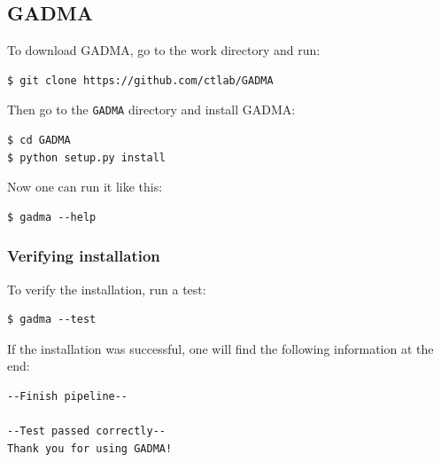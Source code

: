 \documentclass[12pt]{article}
\makeatletter
\newcommand{\py}[1]{\lstinline[language=Python, showstringspaces=False]@#1@}
\makeatother
\begin{document}
\subsection{GADMA}
To download GADMA, go to the work directory and run:

\begin{lstlisting}
$ git clone https://github.com/ctlab/GADMA
\end{lstlisting}

Then go to the \py{GADMA} directory and install GADMA:
\begin{lstlisting}
$ cd GADMA
$ python setup.py install
\end{lstlisting}

Now one can run it like this:
\begin{lstlisting}
$ gadma --help
\end{lstlisting}

\subsubsection{Verifying installation}
To verify the installation, run a test:

\begin{lstlisting}
$ gadma --test
\end{lstlisting}

If the installation was successful, one will find the following information at the end:
\begin{lstlisting}
--Finish pipeline--

--Test passed correctly--
Thank you for using GADMA!
\end{lstlisting}
\end{document}

